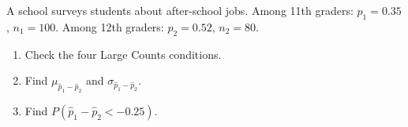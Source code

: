 \documentclass[10pt]{article}
\begin{document}
\namedateperiod

\vspace{0.15in}

A school surveys students about after-school jobs. Among 11th graders: $p_1 = 0.35$,
$n_1 = 100$. Among 12th graders: $p_2 = 0.52$, $n_2 = 80$.

\begin{enumerate}
  \item Check the four Large Counts conditions.
        \vspace{0.6in}

  \item Find $\mu_{\hat{p}_1-\hat{p}_2}$ and $\sigma_{\hat{p}_1-\hat{p}_2}$.
        \vspace{0.6in}

  \item Find $P(\hat{p}_1 - \hat{p}_2 < -0.25)$.
        \vspace{0.9in}
\end{enumerate}
\end{document}
